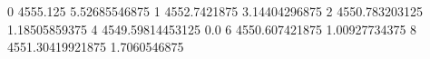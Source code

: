 0 4555.125 5.52685546875
1 4552.7421875 3.14404296875
2 4550.783203125 1.18505859375
4 4549.59814453125 0.0
6 4550.607421875 1.00927734375
8 4551.30419921875 1.7060546875
